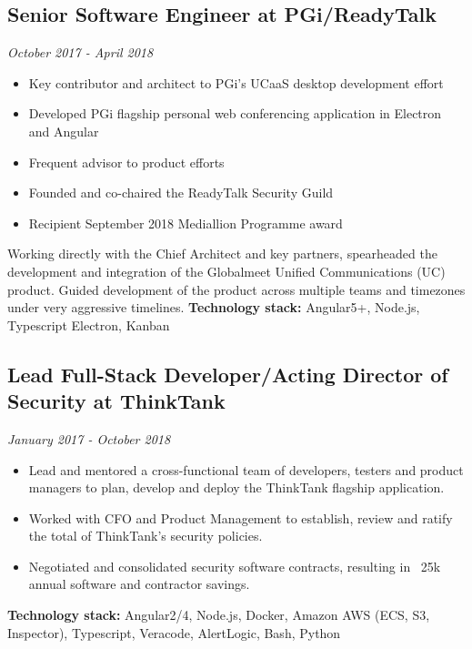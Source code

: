 \documentclass[11pt]{article}
\begin{document}
\subsection*{Senior Software Engineer at PGi/ReadyTalk}
\emph{October 2017 - April 2018}
\begin{itemize}
  \item Key contributor and architect to PGi's UCaaS desktop development effort
  \item Developed PGi flagship personal web conferencing application in Electron and Angular
  \item Frequent advisor to product efforts
  \item Founded and co-chaired the ReadyTalk Security Guild
  \item Recipient September 2018 Mediallion Programme award
\end{itemize}
Working directly with the Chief Architect and key partners, spearheaded the
development and integration of the Globalmeet Unified Communications (UC)
product. Guided development of the product across multiple teams and timezones
under very aggressive timelines.
\textbf{Technology stack:} Angular5+, Node.js, Typescript Electron, Kanban

\subsection*{Lead Full-Stack Developer/Acting Director of Security at ThinkTank}
\emph{January 2017 - October 2018}
\begin{itemize}
  \item Lead and mentored a cross-functional team of developers, testers and product managers to plan, develop and deploy the ThinkTank flagship application.
  \item Worked with CFO and Product Management to establish, review and ratify the total of ThinkTank's security policies.
  \item Negotiated and consolidated security software contracts, resulting in ~25k annual software and contractor savings.
\end{itemize}
\textbf{Technology stack:} Angular2/4, Node.js, Docker, Amazon AWS (ECS, S3, Inspector), Typescript, Veracode, AlertLogic, Bash, Python
\end{document}
